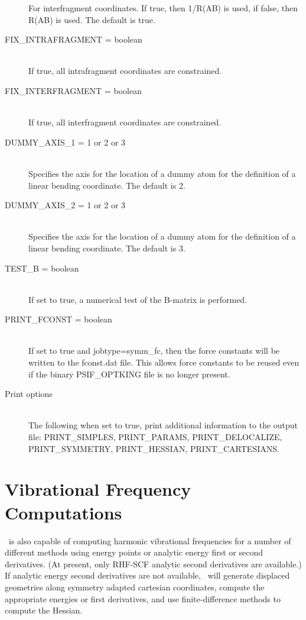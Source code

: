 \begin{description}
For interfragment coordinates.  If true, then 1/R(AB) is used, if false,
then R(AB) is used.  The default is true.
\item[FIX\_INTRAFRAGMENT = boolean]\mbox{}\\
If true, all intrafragment coordinates are constrained.
\item[FIX\_INTERFRAGMENT = boolean]\mbox{}\\
If true, all interfragment coordinates are constrained.
\item[DUMMY\_AXIS\_1 = 1 or 2 or 3]\mbox{}\\
Specifies the axis for the location of a dummy atom for the definition
of a linear bending coordinate.  The default is 2.
\item[DUMMY\_AXIS\_2 = 1 or 2 or 3]\mbox{}\\
Specifies the axis for the location of a dummy atom for the definition
of a linear bending coordinate.  The default is 3.
\item[TEST\_B = boolean]\mbox{}\\
If set to true, a numerical test of the B-matrix is performed.
\item[PRINT\_FCONST = boolean]\mbox{}\\
If set to true and jobtype=symm\_fc, then the force constants will
be written to the fconst.dat file.  This allows force constants to be
reused even if the binary PSIF\_OPTKING file is no longer present.
\item[Print options]\mbox{}\\
The following when set to true, print additional information to the
output file: PRINT\_SIMPLES, PRINT\_PARAMS, PRINT\_DELOCALIZE,
PRINT\_SYMMETRY, PRINT\_HESSIAN, PRINT\_CARTESIANS.
\end{description}


\section{Vibrational Frequency Computations} \label{freq}
\PSIthree\ is also capable of computing harmonic vibrational frequencies
for a number of different methods using energy points or analytic energy first or
second derivatives.  (At present, only RHF-SCF analytic second derivatives
are available.)  If analytic energy second derivatives are not available,
\PSIthree\ will generate displaced geometries along symmetry adapted cartesian
coordinates, compute the appropriate energies or first derivatives, and use
finite-difference methods to compute the Hessian.

